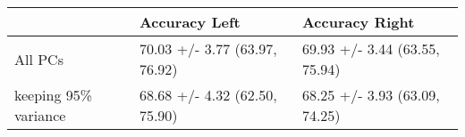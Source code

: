\begin{tabular}{lll}
\toprule
{} &                  Accuracy Left &                 Accuracy Right \\
\midrule
All PCs              &  70.03 +/- 3.77 (63.97, 76.92) &  69.93 +/- 3.44 (63.55, 75.94) \\
keeping 95\% variance &  68.68 +/- 4.32 (62.50, 75.90) &  68.25 +/- 3.93 (63.09, 74.25) \\
\bottomrule
\end{tabular}
